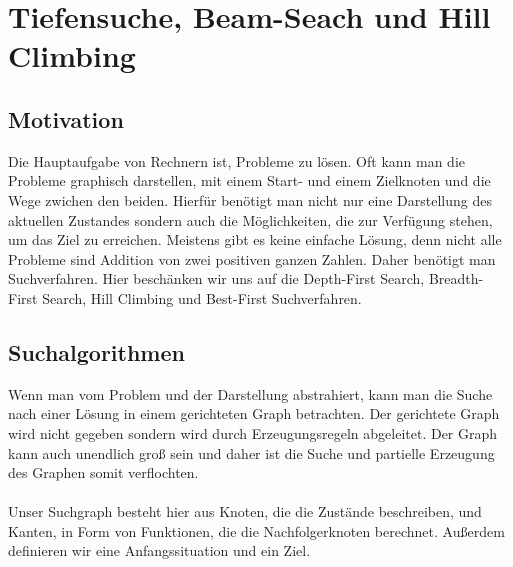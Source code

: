 
\chapter{Tiefensuche, Beam-Seach und Hill Climbing}


\algnewcommand{}
\algnewcommand\INPUT{\item[\algorithmicinput]}

\renewcommand{\thesubsubsection}{(\alph{subsubsection})}


  \lstset{language=Haskell,frame=single,basicstyle=\small\ttfamily,numbers=left,firstnumber=1}
  \lstset{language=Prolog,frame=single,basicstyle=\small\ttfamily,numbers=left,firstnumber=1}

\section{Motivation}

Die Hauptaufgabe von Rechnern ist, Probleme zu lösen. Oft kann man die Probleme graphisch darstellen, mit einem Start- und einem Zielknoten und die Wege zwichen den beiden. Hierfür benötigt man nicht nur eine Darstellung des aktuellen Zustandes sondern auch die Möglichkeiten, die zur Verfügung stehen, um das Ziel zu erreichen. Meistens gibt es keine einfache Lösung, denn nicht alle Probleme sind Addition von zwei positiven ganzen Zahlen. Daher benötigt man Suchverfahren. Hier beschänken wir uns auf die Depth-First Search, Breadth-First Search, Hill Climbing und Best-First Suchverfahren.

\section{Suchalgorithmen}

Wenn man vom Problem und der Darstellung abstrahiert, kann man die Suche nach einer Lösung in einem gerichteten Graph betrachten. Der gerichtete Graph wird nicht gegeben  sondern wird durch Erzeugungsregeln abgeleitet. Der Graph kann auch unendlich groß sein und daher ist die Suche und partielle Erzeugung des Graphen somit verflochten. \\
\\
Unser Suchgraph besteht hier aus Knoten, die die Zustände beschreiben, und Kanten, in Form von Funktionen, die die Nachfolgerknoten berechnet. Außerdem definieren wir eine Anfangssituation und ein Ziel.\\

